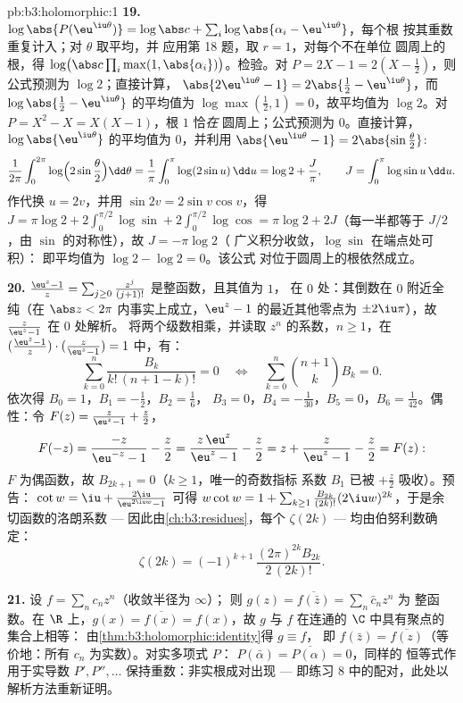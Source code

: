 \begin{solution}{pb:b3:holomorphic:1}
\textbf{19.} $\log\abs{P(\eu^{\iu\theta})} = \log\abs c +
\sum_i\log\abs{\alpha_i - \eu^{\iu\theta}}$，每个根
按其重数重复计入；对 $\theta$ 取平均，并
应用第 18 题，取 $r = 1$，对每个不在单位
圆周上的根，得 $\log\bigl(\abs c\prod_i\max(1,
\abs{\alpha_i})\bigr)$。检验。对 $P = 2X - 1 = 2(X -
\frac12)$，则公式预测为 $\log 2$；直接计算，
$\abs{2\eu^{\iu\theta} - 1} = 2\abs{\frac12 -
\eu^{\iu\theta}}$，而 $\log\abs{\frac12 -
\eu^{\iu\theta}}$ 的平均值为 $\log\max(\frac12, 1) = 0$，故平均值为 $\log
2$。对 $P = X^2 - X = X(X - 1)$，根 $1$ 恰\emph{在}
圆周上；公式预测为 $0$。直接计算，
$\log\abs{\eu^{\iu\theta}}$ 的平均值为 $0$，并利用
$\abs{\eu^{\iu\theta} - 1} = 2\abs{\sin\frac\theta2}$:
\[
\frac1{2\pi}\int_0^{2\pi}
\log\Bigl(2\sin\frac\theta2\Bigr)\dd\theta
= \frac1\pi\int_0^\pi\log(2\sin u)\,\dd u
= \log 2 + \frac J\pi,
\qquad J = \int_0^\pi\log\sin u\,\dd u .
\]
作代换 $u = 2v$，并用 $\sin 2v = 2\sin v\cos v$，得
$J = \pi\log2 + 2\int_0^{\pi/2}\log\sin +
2\int_0^{\pi/2}\log\cos = \pi\log 2 + 2J$（每一半都等于
$J/2$，由 $\sin$ 的对称性），故 $J = -\pi\log 2$（
广义积分收敛，$\log\sin$ 在端点处可积）：
即平均值为 $\log2 - \log2 = 0$。该公式
对位于圆周上的根依然成立。

\textbf{20.} $\frac{\eu^z - 1}z =
\sum_{j\geq0}\frac{z^j}{(j+1)!}$ 是整函数，且其值为 $1$，
在 $0$ 处：其倒数在 $0$ 附近全纯（在 $\abs z <
2\pi$ 内事实上成立，$\eu^z - 1$ 的最近其他零点为
$\pm2\iu\pi$），故 $\frac z{\eu^z-1}$ 在 $0$ 处解析。
将两个级数相乘，并读取
$z^n$ 的系数，$n \geq 1$，在 $(\frac{\eu^z-1}z)\cdot(\frac
z{\eu^z-1}) = 1$ 中，有：
\[
\sum_{k=0}^{n}\frac{B_k}{k!\,(n+1-k)!} = 0
\quad\Longleftrightarrow\quad
\sum_{k=0}^{n}\binom{n+1}{k}B_k = 0 .
\]
依次得 $B_0 = 1$，$B_1 = -\frac12$，$B_2 = \frac16$，
$B_3 = 0$，$B_4 = -\frac1{30}$，$B_5 = 0$，$B_6 =
\frac1{42}$。偶性：令 $F(z) = \frac z{\eu^z-1} +
\frac z2$，
\[
F(-z) = \frac{-z}{\eu^{-z} - 1} - \frac z2
= \frac{z\,\eu^z}{\eu^z - 1} - \frac z2
= z + \frac{z}{\eu^z - 1} - \frac z2 = F(z) :
\]
$F$ 为偶函数，故 $B_{2k+1} = 0$（$k \geq 1$，唯一的奇数指标
系数 $B_1$ 已被 $+\frac z2$ 吸收）。预告：
$\cot w = \iu + \frac{2\iu}{\eu^{2\iu w}-1}$ 可得
$w\cot w = 1 + \sum_{k\geq1}\frac{B_{2k}}{(2k)!}(2\iu
w)^{2k}$，于是余切函数的洛朗系数 ---
因此由\cref{ch:b3:residues}，每个 $\zeta(2k)$ ---
均由伯努利数确定：
\[
\zeta(2k) = (-1)^{k+1}\,\frac{(2\pi)^{2k}B_{2k}}{2\,(2k)!} .
\]

\textbf{21.} 设 $f = \sum_nc_nz^n$（收敛半径为 $\infty$）；
则 $g(z) = \overline{f(\bar z)} = \sum_n\bar c_nz^n$ 为
整函数。在 $\R$ 上，$g(x) = \overline{f(x)} = f(x)$，故 $g$ 与
$f$ 在连通的 $\C$ 中具有聚点的集合上相等：
由\cref{thm:b3:holomorphic:identity}得 $g \equiv f$，
即 $f(\bar z) = \overline{f(z)}$（等价地：所有
$c_n$ 为实数）。对实多项式 $P$：
$P(\bar\alpha) = \overline{P(\alpha)} = 0$，同样的
恒等式作用于实导数 $P', P'', \dots$
保持重数：非实根成对出现 ---
即练习 8 中的配对，此处以解析方法重新证明。


\end{solution}
